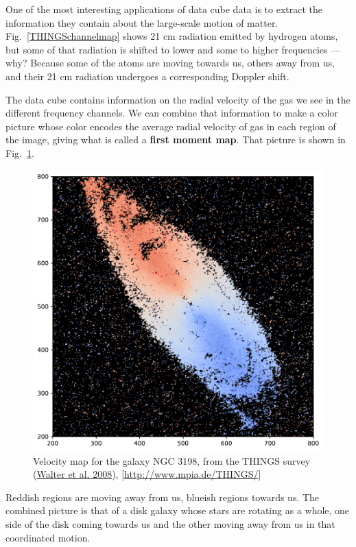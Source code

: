 \documentclass[twocolumn,apj]{openjournal}
\begin{document}
One of the most interesting applications of data cube data is to extract the information they contain about the large-scale motion of matter. Fig.~\ref{THINGSchannelmap} shows 21 cm radiation emitted by hydrogen atoms, but some of that radiation is shifted to lower and some to higher frequencies --- why? Because some of the atoms are moving towards us, others away from us, and their 21 cm radiation undergoes a corresponding Doppler shift. 

The data cube contains information on the radial velocity of the gas we see in the different frequency channels. We can combine that information to make a color picture whose color encodes the average radial velocity of gas in each region of the image, giving what is called a {\bf first moment map}. That picture is shown in Fig.~\ref{ThingsFirstMoment}. 
\begin{figure}[htbp]
\begin{center}
\includegraphics[width=\linewidth]{firstMoment.pdf}
\caption{Velocity map for the galaxy NGC 3198, from the THINGS survey (\href{https://ui.adsabs.harvard.edu/abs/2008AJ....136.2563W/abstract}{Walter et al. 2008}),
[\href{http://www.mpia.de/THINGS/}{http://www.mpia.de/THINGS/}] }
\label{ThingsFirstMoment}
\end{center}
\end{figure}
Reddish regions are moving away from us, blueish regions towards us. The combined picture is that of a disk galaxy whose stars are rotating as a whole, one side of the disk coming towards us and the other moving away from us in that coordinated motion. 
\end{document}
